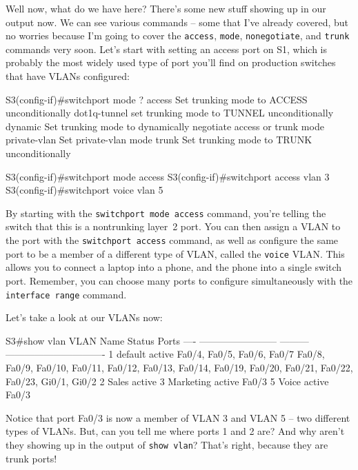 Well now, what do we have here? There's some new stuff showing up in our
output now. We can see various commands -- some that I've already
covered, but no worries because I'm going to cover the \texttt{access},
\texttt{mode}, \texttt{nonegotiate}, and \texttt{trunk} commands very
soon. Let's start with setting an access port on S1, which is probably
the most widely used type of port you'll find on production switches
that have VLANs configured:

\begin{cli}
S3(config-if)#switchport mode ?
  access        Set trunking mode to ACCESS unconditionally
  dot1q-tunnel  set trunking mode to TUNNEL unconditionally
  dynamic       Set trunking mode to dynamically negotiate access or trunk mode
  private-vlan  Set private-vlan mode
  trunk         Set trunking mode to TRUNK unconditionally

S3(config-if)#switchport mode access
S3(config-if)#switchport access vlan 3
S3(config-if)#switchport voice vlan 5
\end{cli}

By starting with the \texttt{switchport\ mode\ access} command, you're
telling the switch that this is a nontrunking layer~2 port. You can then
assign a VLAN to the port with the \texttt{switchport\ access} command,
as well as configure the same port to be a member of a different type of
VLAN, called the \texttt{voice} VLAN. This allows you to connect a
laptop into a phone, and the phone into a single switch port. Remember,
you can choose many ports to configure simultaneously with the
\texttt{interface\ range} command.

Let's take a look at our VLANs now:

\begin{cli}
S3#show vlan
VLAN Name                       Status    Ports
---- ------------------------ --------- -------------------------------
1    default                   active     Fa0/4, Fa0/5, Fa0/6, Fa0/7
                                          Fa0/8, Fa0/9, Fa0/10, Fa0/11,
                                          Fa0/12, Fa0/13, Fa0/14, Fa0/19,
                                          Fa0/20, Fa0/21, Fa0/22, Fa0/23,
                                          Gi0/1, Gi0/2
2    Sales                     active
3    Marketing                 active    Fa0/3
5    Voice                     active    Fa0/3
\end{cli}

Notice that port Fa0/3 is now a member of VLAN 3 and VLAN 5 -- two different types of VLANs.
But, can you tell me where ports 1 and 2 are?
And why aren't they showing up in the output of \texttt{show\ vlan}?
That's right, because they are trunk ports!

